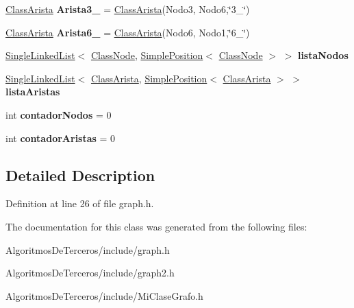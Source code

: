 \begin{DoxyCompactItemize}
\item 
\mbox{\label{class_grafo_ab29129c53c7912aa1bbd603b32d7b2d3}} 
\hyperlink{class_class_arista}{Class\+Arista} {\bfseries Arista3\+\_} = \hyperlink{class_class_arista}{Class\+Arista}(Nodo3, Nodo6,\char`\"{}3\+\_\char`\"{})
\item 
\mbox{\label{class_grafo_a00b2a3cb2e962106be5cbcf60ce668de}} 
\hyperlink{class_class_arista}{Class\+Arista} {\bfseries Arista6\+\_} = \hyperlink{class_class_arista}{Class\+Arista}(Nodo6, Nodo1,\char`\"{}6\+\_\char`\"{})
\item 
\mbox{\label{class_grafo_a5092860f200f0c1e2fb8bf0f871f9827}} 
\hyperlink{class_single_linked_list}{Single\+Linked\+List}$<$ \hyperlink{class_class_node}{Class\+Node}, \hyperlink{class_simple_position}{Simple\+Position}$<$ \hyperlink{class_class_node}{Class\+Node} $>$ $>$ {\bfseries lista\+Nodos}
\item 
\mbox{\label{class_grafo_ad8576a589d4c74776091518f40943b9c}} 
\hyperlink{class_single_linked_list}{Single\+Linked\+List}$<$ \hyperlink{class_class_arista}{Class\+Arista}, \hyperlink{class_simple_position}{Simple\+Position}$<$ \hyperlink{class_class_arista}{Class\+Arista} $>$ $>$ {\bfseries lista\+Aristas}
\item 
\mbox{\label{class_grafo_acba59ba1597a3602b716baf94ee1489b}} 
int {\bfseries contador\+Nodos} = 0
\item 
\mbox{\label{class_grafo_a89bdc2737171d2381341cfa227cb4029}} 
int {\bfseries contador\+Aristas} = 0
\end{DoxyCompactItemize}


\subsection{Detailed Description}


Definition at line 26 of file graph.\+h.



The documentation for this class was generated from the following files\+:\begin{DoxyCompactItemize}
\item 
Algoritmos\+De\+Terceros/include/graph.\+h\item 
Algoritmos\+De\+Terceros/include/graph2.\+h\item 
Algoritmos\+De\+Terceros/include/Mi\+Clase\+Grafo.\+h\end{DoxyCompactItemize}
